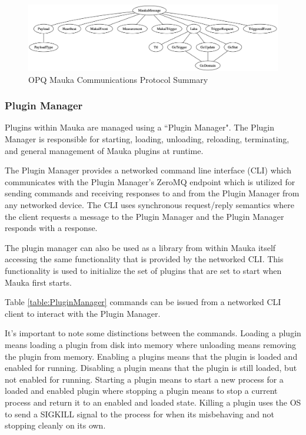 \begin{figure}
	\centering
	\includegraphics[width=\linewidth]{figures/mauka_messages.png}
	\caption{OPQ Mauka Communications Protocol Summary}
	\label{fig:mauka_messages}
\end{figure}

\subsubsection{Plugin Manager}
Plugins within Mauka are managed using a ``Plugin Manager". The Plugin Manager is responsible for starting, loading, unloading, reloading, terminating, and general management of Mauka plugins at runtime. 

The Plugin Manager provides a networked command line interface (CLI) which communicates with the Plugin Manager's ZeroMQ endpoint which is utilized for sending commands and receiving responses to and from the Plugin Manager from any networked device. The CLI uses synchronous request/reply semantics where the client requests a message to the Plugin Manager and the Plugin Manager responds with a response. 

The plugin manager can also be used as a library from within Mauka itself accessing the same functionality that is provided by the networked CLI. This functionality is used to initialize the set of plugins that are set to start when Mauka first starts.

Table \ref{table:PluginManager} commands can be issued from a networked CLI client to interact with the Plugin Manager. 

It's important to note some distinctions between the commands. Loading a plugin means loading a plugin from disk into memory where unloading means removing the plugin from memory. Enabling a plugins means that the plugin is loaded and enabled for running. Disabling a plugin means that the plugin is still loaded, but not enabled for running. Starting a plugin means to start a new process for a loaded and enabled plugin where stopping a plugin means to stop a current process and return it to an enabled and loaded state. Killing a plugin uses the OS to send a SIGKILL signal to the process for when its misbehaving and not stopping cleanly on its own.

